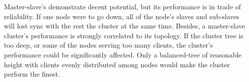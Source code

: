 Master-slave's demonstrate decent potential, but its performance is in trade of reliability. If one node were to go down, all of the node's slaves and sub-slaves will lost sync with the rest the cluster at the same time. Besides, a master-slave cluster's performance is strongly correlated to its topology. If the cluster tree is too deep, or some of the nodes serving too many clients, the cluster's performance could be significantly affected. Only a balanced-tree of reasonable height with clients evenly distributed among nodes would make the cluster perform the finest. 
\